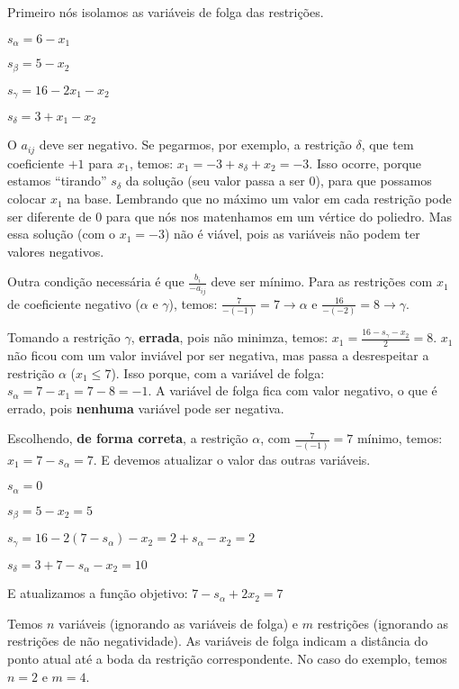 Primeiro nós isolamos as variáveis de folga das restrições.

\begin{example}
    $s_\alpha = 6 - x_1$

    $s_\beta = 5 - x_2$

    $s_\gamma = 16 - 2x_1 - x_2$

    $s_\delta = 3 + x_1 - x_2$
\end{example}

O $a_{ij}$ deve ser negativo. Se pegarmos, por exemplo, a restrição $\delta$, que tem coeficiente $+1$ para $x_1$, temos: $x_1 = -3 + s_\delta + x_2 = -3$. Isso ocorre, porque estamos ``tirando'' $s_\delta$ da solução (seu valor passa a ser 0), para que possamos colocar $x_1$ na base. Lembrando que no máximo um valor em cada restrição pode ser diferente de 0 para que nós nos matenhamos em um vértice do poliedro. Mas essa solução (com o $x_1 = -3$) não é viável, pois as variáveis não podem ter valores negativos.

Outra condição necessária é que $\frac{b_i}{-a_{ij}}$ deve ser mínimo. Para as restrições com $x_1$ de coeficiente negativo ($\alpha$ e $\gamma$), temos: $\frac{7}{-(-1)} = 7 \to \alpha$ e $\frac{16}{-(-2)} = 8 \to \gamma$.

Tomando a restrição $\gamma$, \textbf{errada}, pois não minimza, temos: $x_1 = \frac{16 - s_\gamma - x_2}{2} = 8$. $x_1$ não ficou com um valor inviável por ser negativa, mas passa a desrespeitar a restrição $\alpha$ ($x_1 \leq 7$). Isso porque, com a variável de folga: $s_\alpha = 7 - x_1 = 7 - 8 = -1$. A variável de folga fica com valor negativo, o que é errado, pois \textbf{nenhuma} variável pode ser negativa.

Escolhendo, \textbf{de forma correta}, a restrição $\alpha$, com $\frac{7}{-(-1)} = 7$ mínimo, temos: $x_1 = 7 - s_\alpha = 7$. E devemos atualizar o valor das outras variáveis.

\begin{example}
    $s_\alpha = 0$

    $s_\beta = 5 - x_2 = 5$
    
    $s_\gamma = 16 - 2 (7 - s_\alpha) - x_2 = 2+ s_\alpha-x_2 = 2$
    
    $s_\delta = 3 + 7 - s_\alpha - x_2 = 10$
    
    E atualizamos a função objetivo: $7 - s_\alpha + 2x_2 = 7$
\end{example}

Temos $n$ variáveis (ignorando as variáveis de folga) e $m$ restrições (ignorando as restrições de não negatividade). As variáveis de folga indicam a distância do ponto atual até a boda da restrição correspondente. No caso do exemplo, temos $n=2$ e $m=4$.

